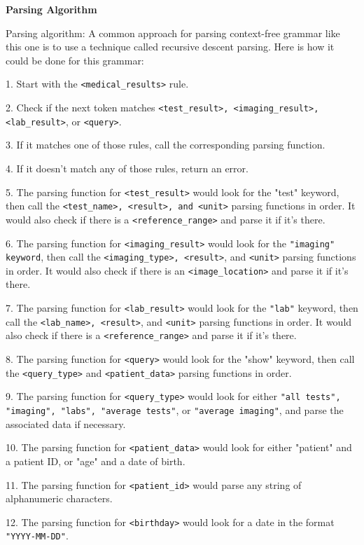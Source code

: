 \vspace{1em}

\textbf{Parsing Algorithm}

Parsing algorithm: 
A common approach for parsing context-free grammar like this one is to use a technique called recursive descent parsing. Here is how it could be done for this grammar:

1. Start with the \texttt{<medical\_results>} rule.

2. Check if the next token matches \texttt{<test\_result>, <imaging\_result>, <lab\_result>}, or \texttt{<query>}.

3. If it matches one of those rules, call the corresponding parsing function.

4. If it doesn't match any of those rules, return an error.

5. The parsing function for \texttt{<test\_result>} would look for the "test" keyword, then call the \texttt{<test\_name>, <result>, and <unit>} parsing functions in order. It would also check if there is a \texttt{<reference\_range>} and parse it if it's there.

6. The parsing function for \texttt{<imaging\_result>} would look for the \texttt{"imaging" keyword}, then call the \texttt{<imaging\_type>, <result>}, and \texttt{<unit>} parsing functions in order. It would also check if there is an \texttt{<image\_location>} and parse it if it's there.

7. The parsing function for \texttt{<lab\_result>} would look for the \texttt{"lab"} keyword, then call the \texttt{<lab\_name>, <result>}, and \texttt{<unit>} parsing functions in order. It would also check if there is a \texttt{<reference\_range>} and parse it if it's there.

8. The parsing function for \texttt{<query>} would look for the "show" keyword, then call the \texttt{<query\_type>} and \texttt{<patient\_data>} parsing functions in order.

9. The parsing function for \texttt{<query\_type>} would look for either \texttt{"all tests", "imaging", "labs", "average tests"}, or \texttt{"average imaging"}, and parse the associated data if necessary.

10. The parsing function for \texttt{<patient\_data>} would look for either "patient" and a patient ID, or "age" and a date of birth.

11. The parsing function for \texttt{<patient\_id>} would parse any string of alphanumeric characters.

12. The parsing function for \texttt{<birthday>} would look for a date in the format \texttt{"YYYY-MM-DD"}.

